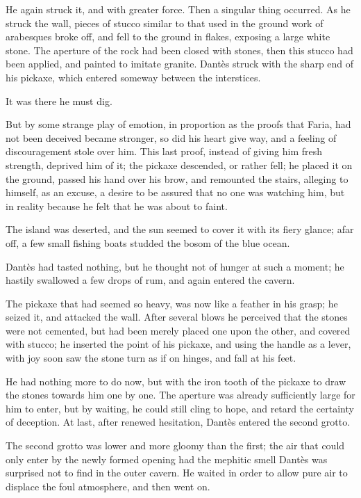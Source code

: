  He again struck it, and with greater force. Then a singular thing occurred. As he struck the wall, pieces of stucco similar to that used in the ground work of arabesques broke off, and fell to the ground in flakes, exposing a large white stone. The aperture of the rock had been closed with stones, then this stucco had been applied, and painted to imitate granite. Dantès struck with the sharp end of his pickaxe, which entered someway between the interstices. 

 It was there he must dig. 

 But by some strange play of emotion, in proportion as the proofs that Faria, had not been deceived became stronger, so did his heart give way, and a feeling of discouragement stole over him. This last proof, instead of giving him fresh strength, deprived him of it; the pickaxe descended, or rather fell; he placed it on the ground, passed his hand over his brow, and remounted the stairs, alleging to himself, as an excuse, a desire to be assured that no one was watching him, but in reality because he felt that he was about to faint. 

 The island was deserted, and the sun seemed to cover it with its fiery glance; afar off, a few small fishing boats studded the bosom of the blue ocean. 

 Dantès had tasted nothing, but he thought not of hunger at such a moment; he hastily swallowed a few drops of rum, and again entered the cavern. 

 The pickaxe that had seemed so heavy, was now like a feather in his grasp; he seized it, and attacked the wall. After several blows he perceived that the stones were not cemented, but had been merely placed one upon the other, and covered with stucco; he inserted the point of his pickaxe, and using the handle as a lever, with joy soon saw the stone turn as if on hinges, and fall at his feet. 

 He had nothing more to do now, but with the iron tooth of the pickaxe to draw the stones towards him one by one. The aperture was already sufficiently large for him to enter, but by waiting, he could still cling to hope, and retard the certainty of deception. At last, after renewed hesitation, Dantès entered the second grotto. 

 The second grotto was lower and more gloomy than the first; the air that could only enter by the newly formed opening had the mephitic smell Dantès was surprised not to find in the outer cavern. He waited in order to allow pure air to displace the foul atmosphere, and then went on. 

